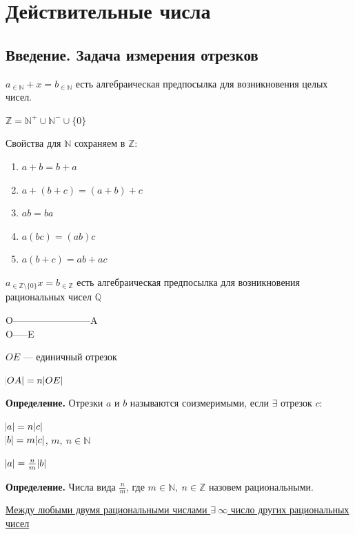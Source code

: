 \documentclass{article}
\begin{document}
    \section{Действительные числа}
        \subsection{Введение. Задача измерения отрезков}
            $a_{\in \mathbb{N}} + x = b_{\in \mathbb{N}}$ есть алгебраическая предпосылка для возникновения целых чисел.
            
            $\mathbb{Z} = \mathbb{N}^{+} \cup \mathbb{N}^{-} \cup \{0\}$
            
            Свойства для $\mathbb{N}$ сохраняем в $\mathbb{Z}$:

            \begin{enumerate}
                \item $a + b = b + a$
                \item $a + (b + c) = (a + b) + c$
                \item $ab = ba$
                \item $a(bc) = (ab)c$
                \item $a(b + c) = ab + ac$
            \end{enumerate}
            
            $a_{\in \mathbb{Z} \textrm{\textbackslash} \{0\}}x = b_{\in \mathbb{Z}}$ есть алгебраическая предпосылка для возникновения рациональных чисел $\mathbb{Q}$
            
            O------------------------A\\
            O-----E
            
            $OE$ --- единичный отрезок

            $\abs{OA} = n \abs{OE}$
            
            \textbf{Определение.} Отрезки $a$ и $b$ называются соизмеримыми, если $\exists$ отрезок $c$:
            
            $\abs{a}=n\abs{c}$\\
            $\abs{b}=m\abs{c}$, $m,\ n \in \mathbb{N}$

            $\abs{a} = \frac{n}{m}\abs{b}$
            
            \textbf{Определение.} Числа вида $\frac{n}{m}$, где $m \in \mathbb{N},\ n \in \mathbb{Z}$ назовем рациональными.

            \underline{Между любыми двумя рациональными числами $\exists\ \infty$ число других рациональных чисел}
\end{document}
